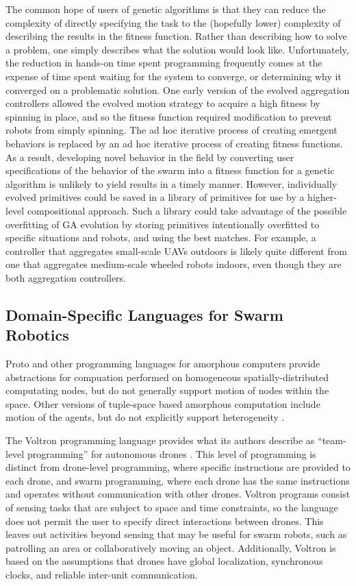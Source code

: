 \documentclass[]{article}
\begin{document}
The common hope of users of genetic algorithms is that they can reduce the complexity of directly specifying the task to the (hopefully lower) complexity of describing the results in the fitness function.
Rather than describing how to solve a problem, one simply describes what the solution would look like. 
Unfortunately, the reduction in hands-on time spent programming frequently comes at the expense of time spent waiting for the system to converge, or determining why it converged on a problematic solution. 
One early version of the evolved aggregation controllers allowed the evolved motion strategy to acquire a high fitness by spinning in place, and so the fitness function required modification to prevent robots from simply spinning. 
The ad hoc iterative process of creating emergent behaviors is replaced by an ad hoc iterative process of creating fitness functions.
As a result, developing novel behavior in the field by converting user specifications of the behavior of the swarm into a fitness function for a genetic algorithm is unlikely to yield results in a timely manner. 
However, individually evolved primitives could be saved in a library of primitives for use by a higher-level compositional approach. 
Such a library could take advantage of the possible overfitting of GA evolution by storing primitives intentionally overfitted to specific situations and robots, and using the best matches. 
For example, a controller that aggregates small-scale UAVs outdoors is likely quite different from one that aggregates medium-scale wheeled robots indoors, even though they are both aggregation controllers. 

\subsection{Domain-Specific Languages for Swarm Robotics}

Proto and other programming languages for amorphous computers provide abstractions for compuation performed on homogeneous spatially-distributed computating nodes, but do not generally support motion of nodes within the space. 
Other versions of tuple-space based amorphous computation include motion of the agents, but do not explicitly support heterogeneity \cite{viroli2012linda}.

The Voltron programming language provides what its authors describe as ``team-level programming'' for autonomous drones \cite{mottola2014team}.
This level of programming is distinct from drone-level programming, where specific instructions are provided to each drone, and swarm programming, where each drone has the same instructions and operates without communication with other drones.
Voltron programs consist of sensing tasks that are subject to space and time constraints, so the language does not permit the user to specify direct interactions between drones. 
This leaves out activities beyond sensing that may be useful for swarm robots, such as patrolling an area or collaboratively moving an object.
Additionally, Voltron is based on the assumptions that drones have global localization, synchronous clocks, and reliable inter-unit communication.   
\end{document}
